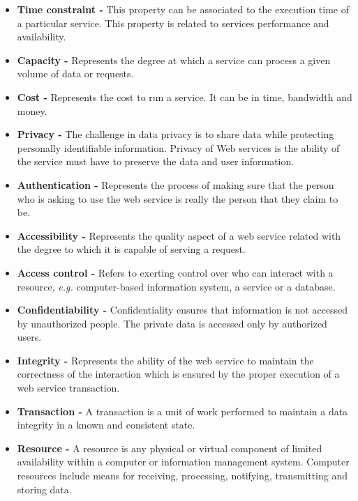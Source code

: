 \begin{itemize}
%   
  \item \textbf{Time constraint -} This property can be associated to
  the execution time of a particular service. This property is related
  to services performance and availability.  
  \item \textbf{Capacity -} Represents the degree at which a service can
  process a given volume of data or requests.
  \item \textbf{Cost -} Represents the cost to run a service. It can be in
   time, bandwidth and money.
  \item \textbf{Privacy -}  The challenge in data privacy is to share
  data while protecting personally identifiable information. Privacy of
  Web services is the ability of the service must have to preserve the data and
  user information. 
  \item \textbf{Authentication -} Represents the process of making sure
  that the person who is asking to use the web service is really the person that
  they claim to be. 
  \item \textbf{Accessibility -} Represents the quality aspect of a web
  service related with the degree to which it is capable of serving a
 request. 
  \item \textbf{Access control -} Refers to exerting control over who can
  interact with a resource, \textit{e.g.} computer-based information system, a
  service or a database. 
  \item \textbf{Confidentiability -} Confidentiality ensures that
  information is not accessed by unauthorized people. The private data is
  accessed only by authorized users. 
  \item \textbf{Integrity -} Represents the ability of the web service to
  maintain the correctness of the interaction which is ensured by the proper
  execution of a web service transaction. 
   \item \textbf{Transaction -} A transaction is a unit of work performed
  to maintain a data integrity in a known and consistent state.
  \item \textbf{Resource -} A resource is any physical or virtual
  component of limited availability within a computer or information management
  system. Computer resources include means for receiving, processing, notifying,
  transmitting and storing data. 
\end{itemize}  


